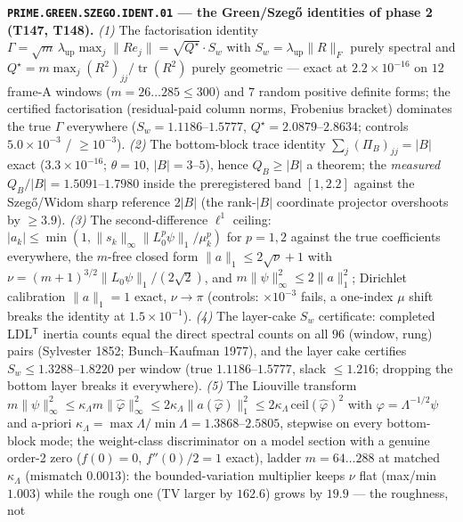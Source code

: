 \par\smallskip\noindent\textbf{\texttt{PRIME.GREEN.SZEGO.IDENT.01} --- the
Green/Szeg\H{o} identities of phase 2 (T147, T148).}
\emph{(1)} The factorisation identity
$\Gamma=\sqrt m\,\lambda_{\mathrm{up}}\max_j\|Re_j\|=\sqrt{Q^\star}\cdot S_w$
with $S_w=\lambda_{\mathrm{up}}\|R\|_F$ purely spectral and
$Q^\star=m\max_j(R^2)_{jj}/\operatorname{tr}(R^2)$ purely geometric ---
exact at $2.2\times10^{-16}$ on $12$ frame-A windows ($m=26\ldots285\le300$)
and $7$ random positive definite forms; the certified factorisation
(residual-paid column norms, Frobenius bracket) dominates the true $\Gamma$
everywhere ($S_w=1.1186$--$1.5777$, $Q^\star=2.0879$--$2.8634$; controls
$5.0\times10^{-3}$ / $\ge10^{-3}$). \emph{(2)} The bottom-block trace
identity $\sum_j(\Pi_B)_{jj}=|B|$ exact ($3.3\times10^{-16}$; $\theta=10$,
$|B|=3$--$5$), hence $Q_B\ge|B|$ a theorem; the \emph{measured}
$Q_B/|B|=1.5091$--$1.7980$ inside the preregistered band $[1,2.2]$ against
the Szeg\H{o}/Widom sharp reference $2|B|$ (the rank-$|B|$ coordinate
projector overshoots by $\ge3.9$). \emph{(3)} The second-difference $\ell^1$
ceiling: $|a_k|\le\min(1,\|s_k\|_\infty\|L_0^p\psi\|_1/\mu_k^p)$ for
$p=1,2$ against the true coefficients everywhere, the $m$-free closed form
$\|a\|_1\le2\sqrt\nu+1$ with $\nu=(m+1)^{3/2}\|L_0\psi\|_1/(2\sqrt2)$, and
$m\|\psi\|_\infty^2\le2\|a\|_1^2$; Dirichlet calibration $\|a\|_1=1$ exact,
$\nu\to\pi$ (controls: $\times10^{-3}$ fails, a one-index $\mu$ shift
breaks the identity at $1.5\times10^{-1}$). \emph{(4)} The layer-cake $S_w$
certificate: completed LDL$^{\mathsf T}$ inertia counts equal the direct
spectral counts on all $96$ (window, rung) pairs (Sylvester 1852;
Bunch--Kaufman 1977), and the layer cake certifies $S_w\le1.3288$--$1.8220$
per window (true $1.1186$--$1.5777$, slack $\le1.216$; dropping the bottom
layer breaks it everywhere). \emph{(5)} The Liouville transform
$m\|\psi\|_\infty^2\le\kappa_\Lambda m\|\hat\varphi\|_\infty^2\le
2\kappa_\Lambda\|a(\hat\varphi)\|_1^2\le
2\kappa_\Lambda\,\mathrm{ceil}(\hat\varphi)^2$ with
$\varphi=\Lambda^{-1/2}\psi$ and a-priori
$\kappa_\Lambda=\max\Lambda/\min\Lambda=1.3868$--$2.5805$, stepwise on every
bottom-block mode; the weight-class discriminator on a model section with a
genuine order-2 zero ($f(0)=0$, $f''(0)/2=1$ exact), ladder $m=64\ldots288$
at matched $\kappa_\Lambda$ (mismatch $0.0013$): the bounded-variation
multiplier keeps $\nu$ flat (max/min $1.003$) while the rough one
($\mathrm{TV}$ larger by $162.6$) grows by $19.9$ --- the roughness, not
